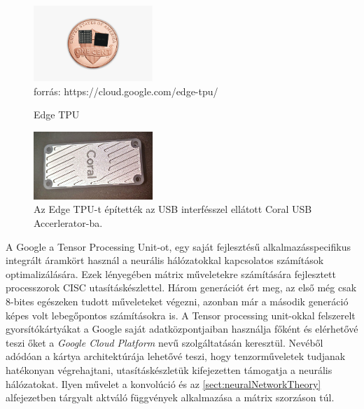 \begin{figure}[h]
	\centering
	\includegraphics[width=0.4\textwidth]{fig/penny-edge-tpu}\\
	\footnotesize forrás: https://cloud.google.com/edge-tpu/
	\caption{Edge TPU}
	\label{fig:EdgeTPU}
\end{figure}
\begin{figure}[h]
	\centering
	\includegraphics[width=0.4\textwidth]{fig/Coral_USBAccelerator}\quad
	\caption[Coral USB Accelerator]{Az Edge TPU-t építették az USB interfésszel ellátott Coral USB Accerlerator-ba.\cite{web:GoogleEdge}}
	\label{fig:coralusbaccelerator}
\end{figure}

A Google a Tensor Processing Unit\texttrademark-ot, egy saját fejlesztésű alkalmazásspecifikus integrált áramkört használ a neurális hálózatokkal kapcsolatos számítások optimalizálására. Ezek lényegében mátrix műveletekre számítására fejlesztett processzorok CISC utasításkészlettel. Három generációt ért meg, az első még csak 8-bites egészeken tudott műveleteket végezni, azonban már a második generáció képes volt lebegőpontos számításokra is. A Tensor processing unit-okkal felszerelt gyorsítókártyákat a Google saját adatközpontjaiban használja főként és elérhetővé teszi őket a \emph{Google Cloud Platform} nevű szolgáltatásán keresztül. Nevéből adódóan a kártya architektúrája lehetővé teszi, hogy  tenzorműveletek tudjanak hatékonyan végrehajtani, utasításkészletük kifejezetten támogatja a neurális hálózatokat. Ilyen művelet a konvolúció és az \ref{sect:neuralNetworkTheory} alfejezetben tárgyalt aktváló függvények alkalmazása a mátrix szorzáson túl.

